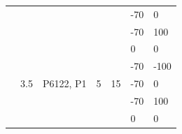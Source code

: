 \begin{table}[]
\begin{tabular}{@{}lllllll@{}}
                                &                                                                                &                                                                           &                                                              &                                                             & -70      & 0      \\
                                &                                                                                &                                                                           &                                                              &                                                             & -70      & 100    \\ \cmidrule(l){2-7} 
                                & \multirow{5}{*}{3.5}                                                           & \multirow{5}{*}{P6122, P1}                                                & \multirow{5}{*}{5}                                           & \multirow{5}{*}{15}                                         & 0        & 0      \\
                                &                                                                                &                                                                           &                                                              &                                                             & -70      & -100   \\
                                &                                                                                &                                                                           &                                                              &                                                             & -70      & 0      \\
                                &                                                                                &                                                                           &                                                              &                                                             & -70      & 100    \\
                                &                                                                                &                                                                           &                                                              &                                                             & 0        & 0      \\ \midrule

\end{tabular}
\end{table}

